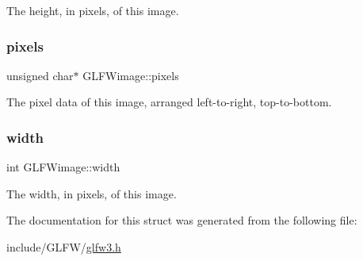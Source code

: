 The height, in pixels, of this image. \mbox{\label{structGLFWimage_a0c532a5c2bb715555279b7817daba0fb}} 
\subsubsection{\texorpdfstring{pixels}{pixels}}
{\footnotesize\ttfamily unsigned char$\ast$ G\+L\+F\+Wimage\+::pixels}

The pixel data of this image, arranged left-\/to-\/right, top-\/to-\/bottom. \mbox{\label{structGLFWimage_af6a71cc999fe6d3aea31dd7e9687d835}} 
\subsubsection{\texorpdfstring{width}{width}}
{\footnotesize\ttfamily int G\+L\+F\+Wimage\+::width}

The width, in pixels, of this image. 

The documentation for this struct was generated from the following file\+:\begin{DoxyCompactItemize}
\item 
include/\+G\+L\+F\+W/\hyperlink{glfw3_8h}{glfw3.\+h}\end{DoxyCompactItemize}

